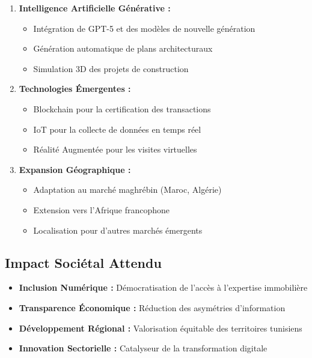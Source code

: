\begin{enumerate}
    \item \textbf{Intelligence Artificielle Générative :}
    \begin{itemize}
        \item Intégration de GPT-5 et des modèles de nouvelle génération
        \item Génération automatique de plans architecturaux
        \item Simulation 3D des projets de construction
    \end{itemize}
    
    \item \textbf{Technologies Émergentes :}
    \begin{itemize}
        \item Blockchain pour la certification des transactions
        \item IoT pour la collecte de données en temps réel
        \item Réalité Augmentée pour les visites virtuelles
    \end{itemize}
    
    \item \textbf{Expansion Géographique :}
    \begin{itemize}
        \item Adaptation au marché maghrébin (Maroc, Algérie)
        \item Extension vers l'Afrique francophone
        \item Localisation pour d'autres marchés émergents
    \end{itemize}
\end{enumerate}

\subsection{Impact Sociétal Attendu}

\begin{itemize}
    \item \textbf{Inclusion Numérique :} Démocratisation de l'accès à l'expertise immobilière
    \item \textbf{Transparence Économique :} Réduction des asymétries d'information
    \item \textbf{Développement Régional :} Valorisation équitable des territoires tunisiens
    \item \textbf{Innovation Sectorielle :} Catalyseur de la transformation digitale
\end{itemize}

